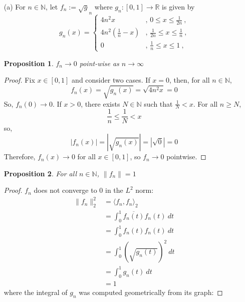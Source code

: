 \documentclass[12pt, reqno]{amsart}
\newtheorem{prop}{Proposition}[section]
\theoremstyle{definition}
\theoremstyle{remark}
\begin{document}
\begin{itemize}
\vspace{0.1 cm}
\item[(a)]  For $n \in \mathbb{N}$, let $f_n := \sqrt g_n$ where $g_n: [0,1] \to \mathbb{R}$ is given by
\begin{equation*}
g_n(x) = \begin{cases} 4 n^2 x & \mbox{, } 0 \leq x \leq \frac{1}{2n} ~\mbox{,} \\      
                                          4n^2 (\frac{1}{n} - x) & \mbox{, } \frac{1}{2n} \leq x \leq \frac{1}{n} ~\mbox{,} \\
                                          0  & \mbox{, } \frac{1}{n} \leq x \leq 1 ~\mbox{,}
\end{cases}        
\end{equation*}

\begin{prop}
    $f_n\to0$ point-wise as $n\to\infty$
\end{prop}

\begin{proof}
    Fix $x\in[0,1]$ and consider two cases. If $x=0$, then, for all $n\in \mathbb{N}$, $$f_{n}(x)=\sqrt{g_{n}(x)}=\sqrt{4n^{2}x}=0$$So, $f_{n}(0)\rightarrow 0$. If $x>0$, there exists $N\in \mathbb{N}$ such that $\frac{1}{N}<x$. For all $n\ge N$, $$\frac{1}{n}\le \frac{1}{N}<x$$so, $$|f_{n}(x)|=\left|\sqrt{g_{n}(x)}\right|= \left|\sqrt{0}\right|=0$$Therefore, $f_{n}(x)\rightarrow 0$ for all $x\in[0,1]$, so $f_{n}\rightarrow 0$ pointwise.
\end{proof}

\begin{prop}
    For all $n\in\mathbb N$, $\|f_n\|=1$
\end{prop}

\begin{proof}
    
$f_{n}$ does not converge to $0$ in the $L^{2}$ norm: \begin{align*}
    \|f_{n}\|_{2}^{2}&= \langle f_{n},f_{n}\rangle_{2}\\
    &= \int_{0}^{1}\overline{f_{n}(t)}f_{n}(t)\ dt\\
    &= \int_{0}^{1}f_{n}(t)f_{n}(t)\ dt\\
    &= \int_{0}^{1}\left(\sqrt{g_{n}(t)}\right)^{2}\ dt\\
    &= \int_{0}^{1}g_{n}(t)\ dt\\
    &= 1
    \end{align*}where the integral of $g_{n}$ was computed geometrically from its graph: 
    

\end{proof}
\end{itemize}
\end{document}
